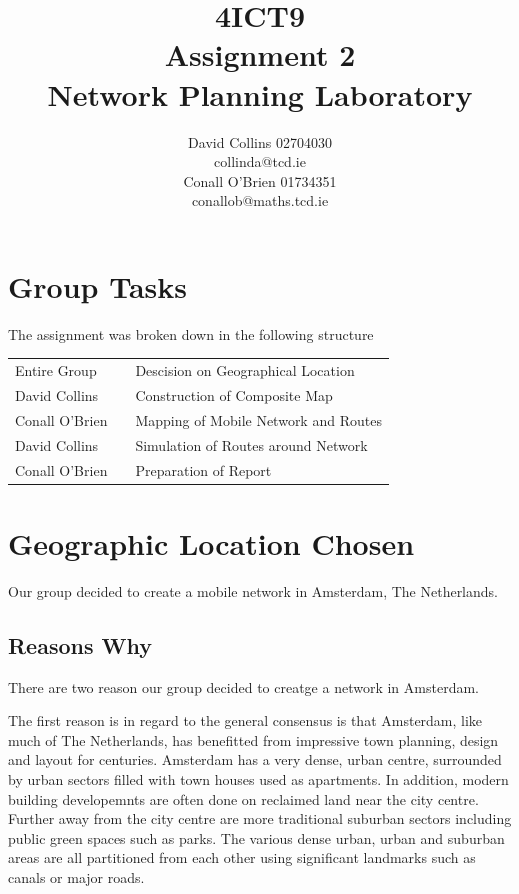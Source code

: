 \documentclass[a4paper,12pt]{article}
\begin{document}
\title{4ICT9 \\ Assignment 2 \\ Network Planning Laboratory}

\author{David Collins 02704030 \\ collinda@tcd.ie \\ 
Conall O'Brien 01734351 \\ conallob@maths.tcd.ie}

\maketitle

\section{Group Tasks}

The assignment was broken down in the following structure

\begin{tabular}{lcl}
Entire Group &	\hspace{15mm}	&	Descision on Geographical Location	\\
David Collins	&					&	Construction of Composite Map			\\
Conall O'Brien	&					&	Mapping of Mobile Network and Routes\\
David Collins	&					&	Simulation of Routes around Network	\\
Conall O'Brien	&					&	Preparation of Report					\\
\end{tabular}

\section{Geographic Location Chosen}

Our group decided to create a mobile network in Amsterdam, The
Netherlands.

\subsection{Reasons Why}

There are two reason our group decided to creatge a network in
Amsterdam.


The first reason is in regard to the general consensus is that 
Amsterdam, like much of The Netherlands, has benefitted from impressive
town planning, design and layout for centuries. Amsterdam has a very 
dense, urban centre, surrounded by urban sectors filled with town houses
used as apartments. In addition, modern building developemnts are often
done on reclaimed land near the city centre. Further away from the city
centre are more traditional suburban sectors including public green
spaces such as parks. The various dense urban, urban and suburban areas
are all partitioned from each other using significant landmarks such as
canals or major roads.
\end{document}
